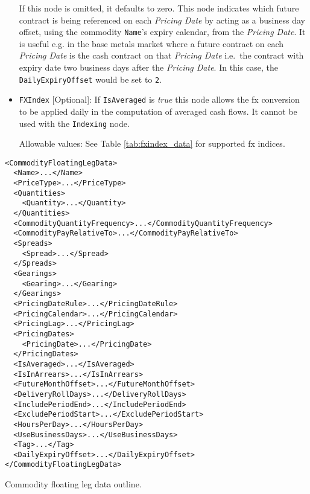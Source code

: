 \begin{itemize}
If this node is omitted, it defaults to zero. This node indicates which future contract is being referenced on each
\textit{Pricing Date} by acting as a business day offset, using the commodity \lstinline!Name!'s expiry calendar, from
the \textit{Pricing Date}. It is useful e.g. in the base metals market where a future contract on each \textit{Pricing
  Date} is the cash contract on that \textit{Pricing Date} i.e.\ the contract with expiry date two business days after
the \textit{Pricing Date}. In this case, the \lstinline!DailyExpiryOffset! would be set to \lstinline!2!.

\item \lstinline!FXIndex! [Optional]: If \lstinline!IsAveraged! is \emph{true} this node allows the fx conversion to be applied daily in the computation of averaged cash flows. It cannot be used with the \lstinline!Indexing! node.

Allowable values:  See Table \ref{tab:fxindex_data} for supported fx indices.
\end{itemize}

\begin{listing}[h!]
\begin{verbatim}
<CommodityFloatingLegData>
  <Name>...</Name>
  <PriceType>...</PriceType>
  <Quantities>
    <Quantity>...</Quantity>
  </Quantities>
  <CommodityQuantityFrequency>...</CommodityQuantityFrequency>
  <CommodityPayRelativeTo>...</CommodityPayRelativeTo>
  <Spreads>
    <Spread>...</Spread>
  </Spreads>
  <Gearings>
    <Gearing>...</Gearing>
  </Gearings>
  <PricingDateRule>...</PricingDateRule>
  <PricingCalendar>...</PricingCalendar>
  <PricingLag>...</PricingLag>
  <PricingDates>
    <PricingDate>...</PricingDate>
  </PricingDates>
  <IsAveraged>...</IsAveraged>
  <IsInArrears>...</IsInArrears>
  <FutureMonthOffset>...</FutureMonthOffset>
  <DeliveryRollDays>...</DeliveryRollDays>
  <IncludePeriodEnd>...</IncludePeriodEnd>
  <ExcludePeriodStart>...</ExcludePeriodStart>
  <HoursPerDay>...</HoursPerDay>
  <UseBusinessDays>...</UseBusinessDays>
  <Tag>...</Tag>
  <DailyExpiryOffset>...</DailyExpiryOffset>
</CommodityFloatingLegData>
\end{verbatim}
\caption{Commodity floating leg data outline.}
\label{lst:commodity_floating_leg_data}
\end{listing}

